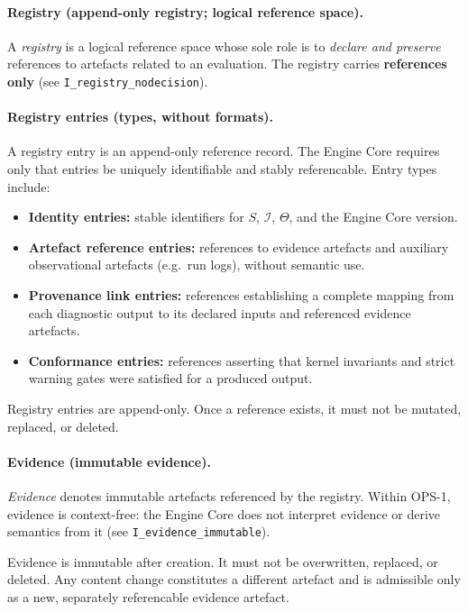 \paragraph{Registry (append-only registry; logical reference space).}
A \emph{registry} is a logical reference space whose sole role is to
\emph{declare and preserve} references to artefacts related to an evaluation.
The registry carries \textbf{references only}
(see \texttt{I\_registry\_nodecision}).

\paragraph{Registry entries (types, without formats).}
A registry entry is an append-only reference record.
The Engine Core requires only that entries be uniquely identifiable and stably
referencable.
Entry types include:
\begin{itemize}
  \item \textbf{Identity entries:} stable identifiers for $S$, $\mathcal{I}$,
        $\Theta$, and the Engine Core version.
  \item \textbf{Artefact reference entries:} references to evidence artefacts and
        auxiliary observational artefacts (e.g.\ run logs), without semantic use.
  \item \textbf{Provenance link entries:} references establishing a complete
        mapping from each diagnostic output to its declared inputs and referenced
        evidence artefacts.
  \item \textbf{Conformance entries:} references asserting that kernel invariants
        and strict warning gates were satisfied for a produced output.
\end{itemize}

Registry entries are append-only.
Once a reference exists, it must not be mutated, replaced, or deleted.

\paragraph{Evidence (immutable evidence).}
\emph{Evidence} denotes immutable artefacts referenced by the registry.
Within OPS-1, evidence is context-free:
the Engine Core does not interpret evidence or derive semantics from it
(see \texttt{I\_evidence\_immutable}).

Evidence is immutable after creation.
It must not be overwritten, replaced, or deleted.
Any content change constitutes a different artefact and is admissible only as a
new, separately referencable evidence artefact.

